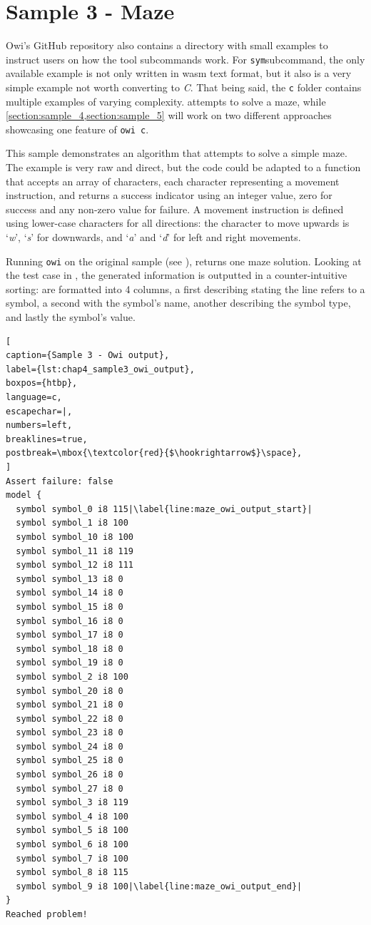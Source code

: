 \section{Sample 3 - Maze}\label{section:sample_3}

Owi's GitHub repository also contains a directory with small examples to instruct users on how the tool subcommands work. For \lstinline$sym$\noindent subcommand, the only available example is not only written in \acrlong{wasm} text format, but it also is a very simple example not worth converting to \textit{C}. That being said, the \lstinline$c$ folder contains multiple examples of varying complexity.  attempts to solve a maze, while \cref{section:sample_4,section:sample_5} will work on two different approaches showcasing one feature of \lstinline$owi c$.

This sample demonstrates an algorithm that attempts to solve a simple maze. The example is very raw and direct, but the code could be adapted to a function that accepts an array of characters, each character representing a movement instruction, and returns a success indicator using an integer value, zero for success and any non-zero value for failure. A movement instruction is defined using lower-case characters for all directions: the character to move upwards is `\textit{w}', `\textit{s}' for downwards, and `\textit{a}' and `\textit{d}' for left and right movements.

Running \lstinline$owi$ on the original sample (see ), returns one maze solution.  Looking at the test case in , the generated information is outputted in a counter-intuitive sorting:  are formatted into 4 columns, a first describing stating the line refers to a symbol, a second with the symbol's name, another describing the symbol type, and lastly the symbol's value.

\begin{lstlisting}[
caption={Sample 3 - Owi output},
label={lst:chap4_sample3_owi_output},
boxpos={htbp},
language=c,
escapechar=|,
numbers=left,
breaklines=true,
postbreak=\mbox{\textcolor{red}{$\hookrightarrow$}\space},
]
Assert failure: false
model {
  symbol symbol_0 i8 115|\label{line:maze_owi_output_start}|
  symbol symbol_1 i8 100
  symbol symbol_10 i8 100
  symbol symbol_11 i8 119
  symbol symbol_12 i8 111
  symbol symbol_13 i8 0
  symbol symbol_14 i8 0
  symbol symbol_15 i8 0
  symbol symbol_16 i8 0
  symbol symbol_17 i8 0
  symbol symbol_18 i8 0
  symbol symbol_19 i8 0
  symbol symbol_2 i8 100
  symbol symbol_20 i8 0
  symbol symbol_21 i8 0
  symbol symbol_22 i8 0
  symbol symbol_23 i8 0
  symbol symbol_24 i8 0
  symbol symbol_25 i8 0
  symbol symbol_26 i8 0
  symbol symbol_27 i8 0
  symbol symbol_3 i8 119
  symbol symbol_4 i8 100
  symbol symbol_5 i8 100
  symbol symbol_6 i8 100
  symbol symbol_7 i8 100
  symbol symbol_8 i8 115
  symbol symbol_9 i8 100|\label{line:maze_owi_output_end}|
}
Reached problem!
\end{lstlisting}

